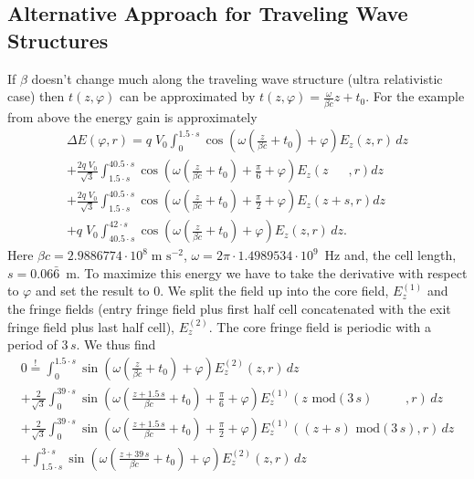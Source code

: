 \subsection{Alternative Approach for Traveling Wave Structures}
If $\beta$ doesn't change much along the traveling wave structure (ultra relativistic case) then $t(z,\varphi)$ can be approximated by $t(z,\varphi)=\frac{\omega}{\beta c}z + t_{0}$. For the example from above the energy gain is approximately
\begin{multline*}
\Delta E(\varphi,r) = q\;V_0 \int_{0}^{1.5\cdot s} \cos\left(\omega \left(\frac{z}{\beta c} + t_{0}\right) + \varphi\right) E_z(z,r)\, dz\\
+ \frac{2 q\;V_{0}}{\sqrt{3}} \int_{1.5\cdot s}^{40.5\cdot s}\cos\left(\omega \left(\frac{z}{\beta c} + t_{0}\right) + \frac{\pi}{6} + \varphi \right) E_z(z\;\;\quad,r) dz\\
+ \frac{2 q\;V_{0}}{\sqrt{3}} \int_{1.5\cdot s}^{40.5\cdot s}\cos\left(\omega \left(\frac{z}{\beta c} + t_{0}\right) + \frac{\pi}{2} + \varphi \right) E_z(z+s,r) dz \\
  + q\;V_{0} \int_{40.5\cdot s}^{42\cdot s} \cos\left(\omega \left(\frac{z}{\beta c} + t_{0}\right) + \varphi\right) E_z(z,r)\, dz.
\end{multline*}
Here $\beta c = 2.9886774\cdot10^8\;\text{m s}^{-2}$, $\omega = 2\pi\cdot 1.4989534\cdot10^9$~Hz and, the cell length, $s = 0.06\bar{6}$~m. To maximize this energy we have to take the derivative with respect to $\varphi$ and set the result to $0$. We split the field up into the core field, $E_z^{(1)}$ and the fringe fields (entry fringe field plus first half cell concatenated with the exit fringe field plus last half cell), $E_z^{(2)}$. The core fringe field is periodic with a period of $3\,s$. We thus find
\begin{multline*}
0 \stackrel{!}{=} \int_{0}^{1.5\cdot s} \sin\left(\omega \left(\frac{z}{\beta c} + t_{0}\right) + \varphi\right) E_z^{(2)}(z,r)\, dz \\
                + \frac{2}{\sqrt{3}} \int_{0}^{39\cdot s}\sin\left(\omega \left(\frac{z + 1.5\,s}{\beta c} + t_{0}\right) + \frac{\pi}{6} + \varphi \right) E_z^{(1)}(z \text{ mod}(3\,s)\;\;\qquad,r)\,dz \\
                + \frac{2}{\sqrt{3}} \int_{0}^{39\cdot s}\sin\left(\omega \left(\frac{z + 1.5\,s}{\beta c} + t_{0}\right) + \frac{\pi}{2} + \varphi \right) E_z^{(1)}((z + s) \text{ mod} (3\,s),r)\, dz \\
                + \int_{1.5\cdot s}^{3\cdot s} \sin\left(\omega\left(\frac{z + 39\,s}{\beta c} + t_{0}\right) + \varphi\right) E_z^{(2)}(z,r)\, dz
\end{multline*}
